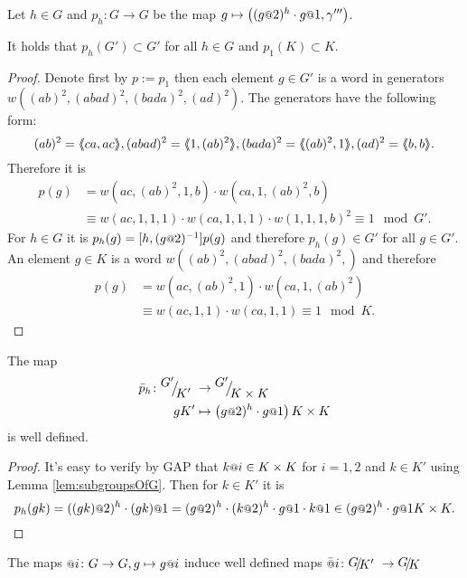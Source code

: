 \documentclass[a4paper,12pt]{article}
\begin{document}
\begin{lem} \label{lem:productOfStatesIsInDerived} 
 Let $h\in G$ and $p_h\colon G\to G$ be the map $g\mapsto \left((g\at{2})^{h}\cdot g\at{1},\gamma'''\right)$.
 
 It holds that $p_h(G')\subset G'$ for all $h\in G$ and $p_1(K)\subset K$. 
\end{lem}
\begin{proof}
 Denote first by $p:=p_1$ then
 each element $g\in G'$ is a word in generators $w((ab)^2,(abad)^2,(bada)^2,(ad)^2)$. 
 The generators have the following form:
 \[(ab)^2=\pair{ca,ac}, (abad)^2 = \pair{1,(ab)^2}, (bada)^2=\pair{(ab)^2,1}, (ad)^2=\pair{b,b}.\]
 Therefore it is
 \begin{align*}
  p(g) &= w(ac,(ab)^2,1,b) \cdot w(ca,1,(ab)^2,b)\\ &\equiv w(ac,1,1,1) \cdot w(ca,1,1,1) \cdot w(1,1,1,b)^2 \equiv 1 \mod G'.
 \end{align*}
 For $h\in G$ it is $p_h(g)=[h,(g\at{2})^{-1}]p(g)$ and therefore $p_h(g)\in G'$ for all $g\in G'$.
 An element $g\in K$ is a word $w((ab)^2,(abad)^2,(bada)^2,)$ and therefore
 \begin{align*}
  p(g) &= w(ac,(ab)^2,1) \cdot w(ca,1,(ab)^2)\\ &\equiv w(ac,1,1) \cdot w(ca,1,1) \equiv 1 \mod K.
 \end{align*}
\end{proof}
\begin{lem} \label{lem:pIsDefinedModK'}
 The map 
 \begin{align*} 
  \bar p_h\colon \RNK{G'}{K'} &\to \RNK{G'}{K\times K}\\
  gK'&\mapsto \left(g\at{2})^h\cdot g\at{1}\right){K\times K}
 \end{align*}
is well defined.
\end{lem}
\begin{proof}
 It's easy to verify by GAP that $k\at{i} \in K\times K$ for $i=1,2$ and $k\in K'$ using Lemma \ref{lem:subgroupsOfG}.
 Then for $k\in K'$ it is 
 \[p_h(gk) = ((gk)\at{2})^h\cdot (gk)\at{1} = (g\at{2})^h\cdot (k\at{2})^h\cdot g\at{1}\cdot k\at{1}\in (g\at{2})^h\cdot g\at{1}K\times K.\]
\end{proof}
\begin{lem} \label{lem:atIsWellDefinedModK'}
 The maps $\at{i}\colon G\to G, g\mapsto g\at{i}$ induce well defined maps $\att{i}\colon \RNK{G}{K'}\to\RNK{G}{K}$
\end{lem}
\end{document}
